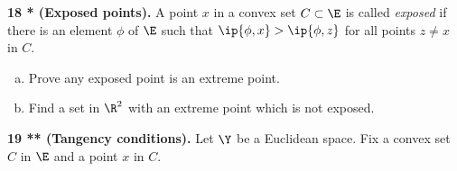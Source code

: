 \documentclass[../borwein-lewis_notes.tex]{subfiles}
\begin{document}
\noindent
\textbf{18 * (Exposed points).} A point $x$ in a convex set 
$C\subset\E$ is called \textit{exposed} if there is an element $\phi$ 
of $\E$ such that $\ip{\phi,x}>\ip{\phi,z}$ for all points $z\neq x$
in $C$.
\begin{enumerate}[(a)]
\item Prove any exposed point is an extreme point. \\
\item Find a set in $\R^2$ with an extreme point which is not exposed.
\\
\end{enumerate}
\textbf{19 ** (Tangency conditions).} Let $\Y$ be a Euclidean space. 
Fix a convex set $C$ in $\E$ and a point $x$ in $C$.
\end{document}
